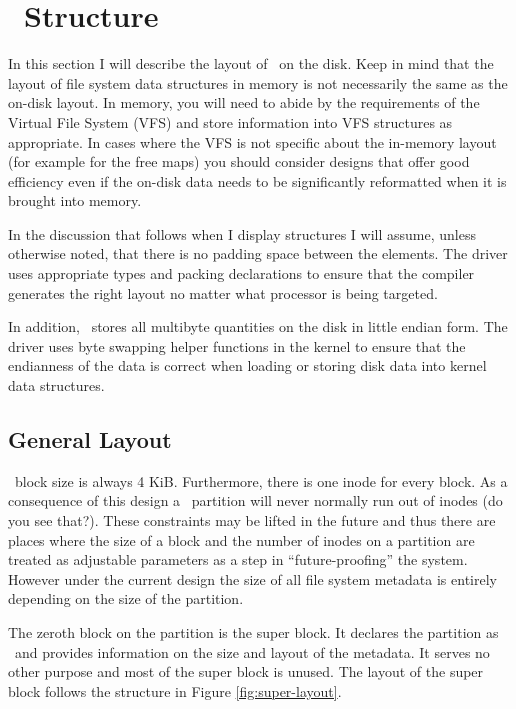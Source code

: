 
\section{\GenericFS\ Structure}
\label{sec:structure}

In this section I will describe the layout of \GenericFS\ on the disk. Keep in mind that the
layout of file system data structures in memory is not necessarily the same as the on-disk
layout. In memory, you will need to abide by the requirements of the Virtual File System (VFS)
and store information into VFS structures as appropriate. In cases where the VFS is not specific
about the in-memory layout (for example for the free maps) you should consider designs that
offer good efficiency even if the on-disk data needs to be significantly reformatted when it is
brought into memory.

In the discussion that follows when I display structures I will assume, unless otherwise noted,
that there is no padding space between the elements. The driver uses appropriate types and
packing declarations to ensure that the compiler generates the right layout no matter what
processor is being targeted.

In addition, \GenericFS\ stores all multibyte quantities on the disk in little endian form. The
driver uses byte swapping helper functions in the kernel to ensure that the endianness of the
data is correct when loading or storing disk data into kernel data structures.

\subsection{General Layout}
\label{sec:structure-general}

\GenericFS\ block size is always 4 KiB. Furthermore, there is one inode for every block. As a
consequence of this design a \GenericFS\ partition will never normally run out of inodes (do you
see that?). These constraints may be lifted in the future and thus there are places where the
size of a block and the number of inodes on a partition are treated as adjustable parameters
as a step in ``future-proofing'' the system. However under the current design the size of all
file system metadata is entirely depending on the size of the partition.

The zeroth block on the partition is the super block. It declares the partition as \GenericFS\
and provides information on the size and layout of the metadata. It serves no other purpose and
most of the super block is unused. The layout of the super block follows the structure in Figure
\ref{fig:super-layout}.

